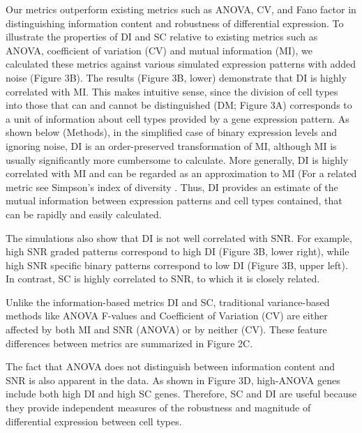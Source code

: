 Our metrics outperform existing metrics such as ANOVA, CV, and Fano factor in distinguishing information content and robustness of differential expression. To illustrate the properties of DI and SC relative to existing metrics such as ANOVA, coefficient of variation (CV) and mutual information (MI), we calculated these metrics against various simulated expression patterns with added noise (Figure 3B). The results (Figure 3B, lower) demonstrate that DI is highly correlated with MI. This makes intuitive sense, since the division of cell types into those that can and cannot be distinguished (DM; Figure 3A) corresponds to a unit of information about cell types provided by a gene expression pattern. As shown below (Methods), in the simplified case of binary expression levels and ignoring noise, DI is an order-preserved transformation of MI, although MI is usually significantly more cumbersome to calculate. More generally, DI is highly correlated with MI and can be regarded as an approximation to MI (For a related metric see Simpson's index of diversity \cite{SIMPSON_1949}. Thus, DI provides an estimate of the mutual information between expression patterns and cell types contained, that can be rapidly and easily calculated. 

The simulations also show that DI is not well correlated with SNR. For example, high SNR graded patterns correspond to high DI (Figure 3B, lower right), while high SNR specific binary patterns correspond to low DI (Figure 3B, upper left). In contrast, SC is highly correlated to SNR, to which it is closely related. 

Unlike the information-based metrics DI and SC, traditional variance-based methods like ANOVA F-values and Coefficient of Variation (CV) are either affected by both MI and SNR (ANOVA) or by neither (CV).  These feature differences between metrics are summarized in Figure 2C.

The fact that ANOVA does not distinguish between information content and SNR is also apparent in the data. As shown in Figure 3D, high-ANOVA genes include both high DI and high SC genes. Therefore, SC and DI are useful because they provide independent measures of the robustness and magnitude of differential expression between cell types.
